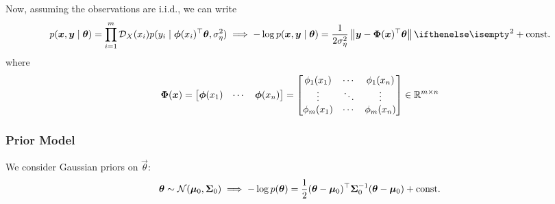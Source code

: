 Now, assuming the observations are i.i.d., we can write
\begin{equation}
  p(\Vec{x}, \Vec{y} \mid \Vec{\theta}) = \prod_{i = 1}^m \CD_X(x_i) p(y_i \mid
  \Vec{\phi}(x_i)^\top \Vec{\theta}, \sigma_\eta^2) \implies -\log p(\Vec{x},
  \Vec{y} \mid \Vec{\theta}) = \frac{1}{2 \sigma_\eta^2} \Norm{\Vec{y} -
  \Mat{\Phi}(\Vec{x})^\top \Vec{\theta}}^2 + \text{const.}
\end{equation}
where
\begin{equation}
  \mathbf{\Phi}(\bm{x}) =
  \begin{bmatrix}
    \bm{\phi}(x_1) & \cdots & \bm{\phi}(x_n)
  \end{bmatrix}
  =
  \begin{bmatrix}
    \phi_1(x_1) & \cdots & \phi_1(x_n) \\
    \vdots & \ddots & \vdots \\
    \phi_m(x_1) & \cdots & \phi_m(x_n)
  \end{bmatrix}
  \in \mathbb{R}^{m \times n}
\end{equation}

\subsubsection{Prior Model}

We consider Gaussian priors on $\Vec{\theta}$:
\begin{equation}
  \bm{\theta} \sim \mathcal{N}(\bm{\mu}_0, \mathbf{\Sigma}_0) \implies -\log
  p(\bm{\theta}) = \frac{1}{2} (\bm{\theta} - \bm{\mu}_0)^\top
  \mathbf{\Sigma}_0^{-1} (\bm{\theta} - \bm{\mu}_0) + \text{const.}
\end{equation}

